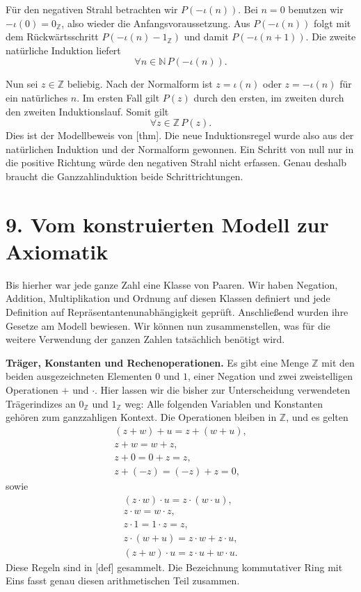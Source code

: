 Für den negativen Strahl betrachten wir \(P(-\iota(n))\).
Bei \(n=0\) benutzen wir
\(-\iota(0)=0_{\mathbb Z}\), also wieder die
Anfangsvoraussetzung. Aus \(P(-\iota(n))\) folgt mit dem
Rückwärtsschritt \(P(-\iota(n)-1_{\mathbb Z})\) und damit
\(P(-\iota(n+1))\). Die zweite natürliche Induktion liefert
\[
  \forall n\in\mathbb N\,P(-\iota(n)).
\]

Nun sei \(z\in\mathbb Z\) beliebig. Nach der Normalform ist
\(z=\iota(n)\) oder \(z=-\iota(n)\) für ein natürliches
\(n\). Im ersten Fall gilt \(P(z)\) durch den ersten, im zweiten
durch den zweiten Induktionslauf. Somit gilt
\[
  \forall z\in\mathbb Z\,P(z).
\]
Dies ist der Modellbeweis von
[thm]. Die neue
Induktionsregel wurde also aus der natürlichen Induktion und der
Normalform gewonnen. Ein Schritt von null nur in die positive
Richtung würde den negativen Strahl nicht erfassen. Genau deshalb
braucht die Ganzzahlinduktion beide Schrittrichtungen.

\par{}
\hypertarget{integers.reading.axioms}{}
\section*{9. Vom konstruierten Modell zur Axiomatik}

Bis hierher war jede ganze Zahl eine Klasse von Paaren. Wir haben
Negation, Addition, Multiplikation und Ordnung auf diesen Klassen
definiert und jede Definition auf Repräsentantenunabhängigkeit
geprüft. Anschließend wurden ihre Gesetze am Modell bewiesen.
Wir können nun zusammenstellen, was für die weitere Verwendung
der ganzen Zahlen tatsächlich benötigt wird.

\medskip\noindent\textbf{Träger, Konstanten und Rechenoperationen.}
Es gibt eine Menge \(\mathbb Z\) mit den beiden ausgezeichneten Elementen \(0\) und
\(1\), einer Negation und zwei zweistelligen Operationen \(+\)
und \(\cdot\). Hier lassen wir die bisher zur Unterscheidung
verwendeten Trägerindizes an \(0_{\mathbb Z}\) und
\(1_{\mathbb Z}\) weg: Alle folgenden Variablen und Konstanten
gehören zum ganzzahligen Kontext. Die Operationen bleiben in
\(\mathbb Z\), und es gelten
\[
  \begin{gathered}
    (z+w)+u=z+(w+u),\\
    z+w=w+z,\\
    z+0=0+z=z,\\
    z+(-z)=(-z)+z=0,
  \end{gathered}
\]
sowie
\[
  \begin{gathered}
    (z\cdot w)\cdot u=z\cdot(w\cdot u),\\
    z\cdot w=w\cdot z,\\
    z\cdot1=1\cdot z=z,\\
    z\cdot(w+u)=z\cdot w+z\cdot u,\\
    (z+w)\cdot u=z\cdot u+w\cdot u.
  \end{gathered}
\]
Diese Regeln sind in
[def] gesammelt.
Die Bezeichnung kommutativer Ring mit Eins fasst genau diesen
arithmetischen Teil zusammen.

